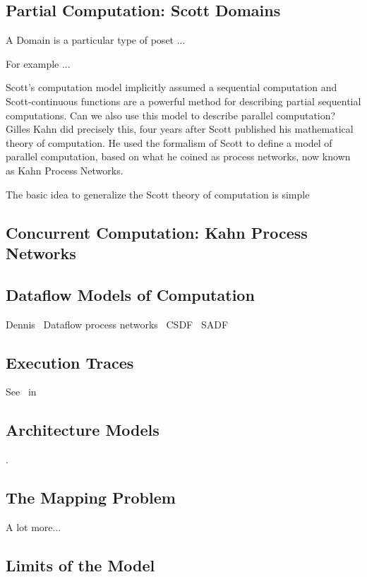 \subsection{Partial Computation: Scott Domains}


A Domain is a particular type of \ac{poset} ... 

For example ...


Scott's computation model implicitly assumed a sequential computation and Scott-continuous functions are a powerful method for describing partial sequential computations.
Can we also use this model to describe parallel computation?
Gilles Kahn did precisely this, four years after Scott published his mathematical theory of computation. 
He used the formalism of Scott to define a model of parallel computation, based on what he coined as process networks, now known as Kahn Process Networks.

The basic idea to generalize the Scott theory of computation is simple



\subsection{Concurrent Computation: Kahn Process Networks}
\Blindtext[10]


\subsection{Dataflow Models of Computation}
Dennis~\cite{dennis1974first,dennis1986data}
\cite{Parks:M95/105}
Dataflow process networks~\cite{lee1995dataflow,lee_matsikoudis_semantics}
CSDF~\cite{bilsen1996cycle}
SADF~\cite{theelen2006scenario}
\cite{lee1987sdf}
\Blindtext[10]

\subsection{Execution Traces}
See~\cite{mazurkiewicz1995introduction} in~\cite{diekert1995book}
\Blindtext[10]

\subsection{Architecture Models}
\cite{pelcat2015models}.
\Blindtext[10]

\subsection{The Mapping Problem}
\cite{singh2013mapping}
A lot more...
\Blindtext[10]
\subsection{Limits of the Model}
\Blindtext[10]

